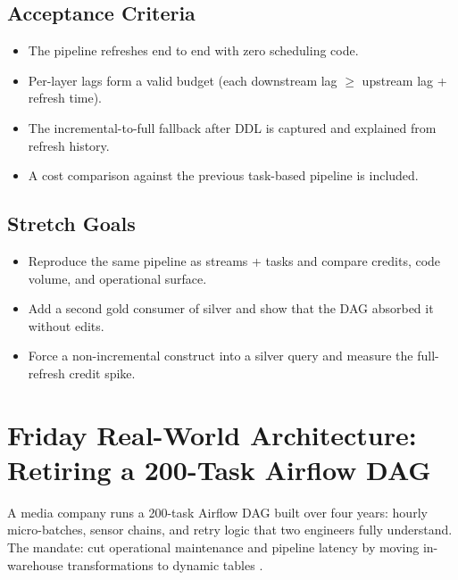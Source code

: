 \subsection*{Acceptance Criteria}
\begin{itemize}
    \item The pipeline refreshes end to end with zero scheduling code.
    \item Per-layer lags form a valid budget (each downstream lag $\geq$ upstream lag + refresh time).
    \item The incremental-to-full fallback after DDL is captured and explained from refresh history.
    \item A cost comparison against the previous task-based pipeline is included.
\end{itemize}

\subsection*{Stretch Goals}
\begin{itemize}
    \item Reproduce the same pipeline as streams + tasks and compare credits, code volume, and operational surface.
    \item Add a second gold consumer of silver and show that the DAG absorbed it without edits.
    \item Force a non-incremental construct into a silver query and measure the full-refresh credit spike.
\end{itemize}

\section{Friday Real-World Architecture: Retiring a 200-Task Airflow DAG}
A media company runs a 200-task Airflow DAG built over four years: hourly micro-batches, sensor chains, and retry logic that two engineers fully understand. The mandate: cut operational maintenance and pipeline latency by moving in-warehouse transformations to dynamic tables \cite{airflowDocs}.

